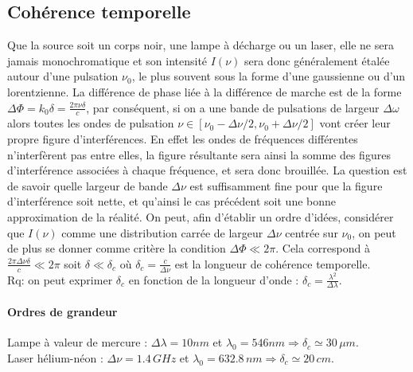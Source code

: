 \documentclass[12pt,prb,aps,epsf]{report}
\begin{document}
\subsection{Cohérence temporelle}
Que la source soit un corps noir, une lampe à décharge ou un laser, elle ne sera jamais monochromatique et son intensité $I(\nu)$ sera donc généralement étalée autour d'une pulsation $\nu_0$, le plus souvent sous la forme d'une gaussienne ou d'un lorentzienne. La différence de phase liée à la différence de marche est de la forme $\Delta\Phi=k_0\delta=\frac{2\pi\nu \delta}{c}$, par conséquent, si on a une bande de pulsations de largeur $\Delta\omega$ alors toutes les ondes de pulsation $\nu \in[\nu_0-\Delta\nu/2,\nu_0+\Delta\nu/2]$ vont créer leur propre figure d'interférences. En effet les ondes de fréquences différentes n'interfèrent pas entre elles, la figure résultante sera ainsi la somme des figures d'interférence associées à chaque fréquence, et sera donc brouillée. La question est de savoir quelle largeur de bande $\Delta\nu$ est suffisamment fine pour que la figure d'interférence soit nette, et qu'ainsi le cas précédent soit une bonne approximation de la réalité. On peut, afin d'établir un ordre d'idées, considérer que $I(\nu)$ comme une distribution carrée de largeur $\Delta\nu$ centrée sur $\nu_0$, on peut de plus se donner comme critère la condition $\Delta\Phi \ll 2\pi$. Cela correspond à $\frac{2\pi\Delta\nu \delta}{c} \ll 2\pi$ soit $\delta \ll \delta_c$ où $\delta_c=\frac{c}{\Delta\nu}$ est la longueur de cohérence temporelle.\\
Rq: on peut exprimer $\delta_c$ en fonction de la longueur d'onde : $\delta_c=\frac{\lambda^2}{\Delta\lambda}$.
\paragraph{Ordres de grandeur}
	Lampe à valeur de mercure : $\Delta\lambda=10 nm$ et $\lambda_0=546nm\Rightarrow \delta_c\simeq30\,\mu m$.\\
	Laser hélium-néon : $\Delta\nu=1.4\, GHz$ et $\lambda_0=632.8\,nm\Rightarrow \delta_c\simeq20\, cm$.\\
	
\end{document}
